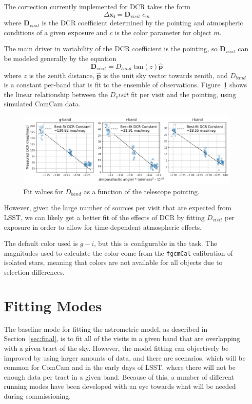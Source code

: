\documentclass[DM,authoryear,toc]{lsstdoc}
\begin{document}
The correction currently implemented for DCR takes the form
\begin{equation}
\Delta \symbf{x_i} = \symbf{D}_{visit} \; c_m
\end{equation}
where $\symbf{D}_{visit}$ is the DCR coefficient determined by the pointing and atmospheric conditions of a given exposure and $c$ is the color parameter for object $m$.

The main driver in variability of the DCR coefficient is the pointing, so $\symbf{D}_{visit}$ can be modeled generally by the equation
\begin{equation}
\symbf{D}_{visit} = D_{band} \; \mathrm{tan}(z) \symbf{\hat{p}}
\end{equation}
where $z$ is the zenith distance, $\symbf{\hat{p}}$ is the unit sky vector towards zenith, and $D_{band}$ is a constant per-band that is fit to the ensemble of observations. Figure~\ref{fig:dcr} shows the linear relationship between the $D_visit$ fit per visit and the pointing, using simulated ComCam data.
\begin{figure}
\includegraphics[width=\columnwidth]{figures/dcr_demo.png}
\caption{Fit values for $D_{band}$ as a function of the telescope pointing. }
\label{fig:dcr}
\end{figure}
However, given the large number of sources per visit that are expected from LSST, we can likely get a better fit of the effects of DCR by fitting $D_{visit}$ per exposure in order to allow for time-dependent atmospheric effects.

The default color used is $g - i$, but this is configurable in the task. The magnitudes used to calculate the color come from the \texttt{fgcmCal} calibration of isolated stars, meaning that colors are not available for all objects due to selection differences. %



\section{Fitting Modes}\label{sec:modes}
The baseline mode for fitting the astrometric model, as described in Section~\ref{sec:final}, is to fit all of the visits in a given band that are overlapping with a given tract of the sky. However, the model fitting can objectively be improved by using larger amounts of data, and there are scenarios, which will be common for ComCam and in the early days of LSST, where there will not be enough data per tract in a given band. Because of this, a number of different running modes have been developed with an eye towards what will be needed during commissioning.
\end{document}
